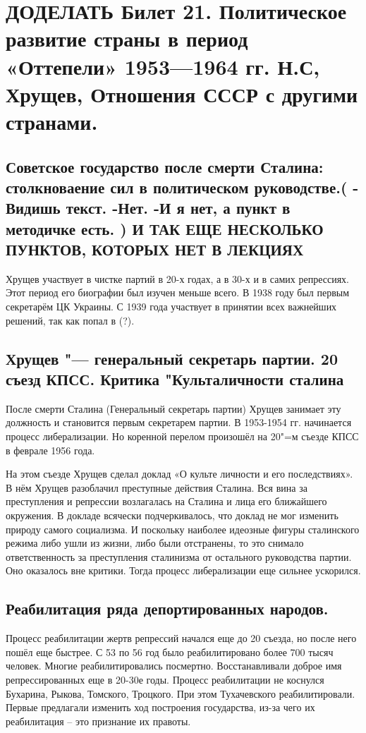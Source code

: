\section{\textbf{ДОДЕЛАТЬ} Билет 21. Политическое развитие страны в период «Оттепели» 1953—1964 гг. Н.С, Хрущев, Отношения СССР с другими странами.}

\subsection{Советское государство после смерти Сталина: столкноваение сил в политическом руководстве.(
-Видишь текст.
-Нет.
-И я нет, а пункт в методичке есть.
) И ТАК ЕЩЕ НЕСКОЛЬКО ПУНКТОВ, КОТОРЫХ НЕТ В ЛЕКЦИЯХ}

Хрущев участвует в чистке партий в 20-х годах, а в 30-х и в самих репрессиях. Этот период его биографии был изучен меньше всего.
В 1938 году был первым секретарём ЦК Украины. С 1939 года участвует в принятии всех важнейших решений, так как попал в (?).

\subsection{Хрущев "--- генеральный секретарь партии. 20 съезд КПСС. Критика "Культаличности сталина}

После смерти Сталина (Генеральный секретарь партии) Хрущев занимает эту должность и становится первым секретарем партии.
В 1953-1954 гг. начинается процесс либерализации. Но коренной перелом произошёл на 20"=м съезде КПСС в феврале 1956 года. 

На этом съезде Хрущев сделал доклад «О культе личности и его последствиях». В нём Хрущев разоблачил преступные действия Сталина. Вся вина за преступления и репрессии возлагалась на Сталина и лица его ближайшего окружения. В докладе всячески подчеркивалось, что доклад не мог изменить природу самого социализма. И поскольку наиболее идеозные фигуры сталинского режима либо ушли из жизни, либо были отстранены, то это снимало ответственность за преступления сталинизма от остального руководства партии. Оно оказалось вне критики. Тогда процесс либерализации еще сильнее ускорился.

\subsection{Реабилитация  ряда депортированных народов.}

Процесс реабилитации жертв репрессий начался еще до 20 съезда, но после него пошёл еще быстрее. С 53 по 56 год было реабилитировано более 700 тысяч человек. Многие реабилитировались посмертно. Восстанавливали доброе имя репрессированных еще в 20-30е годы. Процесс реабилитации не коснулся Бухарина, Рыкова, Томского, Троцкого. При этом Тухачевского реабилитировали. Первые предлагали изменить ход построения государства, из-за чего их реабилитация – это признание их правоты. 

